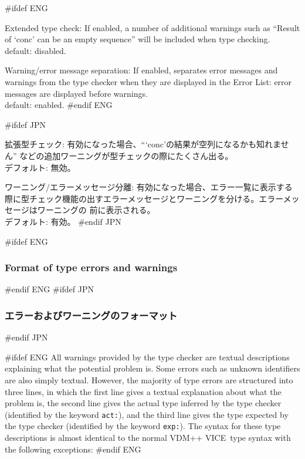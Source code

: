 \documentclass[\pformat,12pt]{article}
\newcommand{\vdmslpp}{VDM-SL}
\newcommand{\vdmslpp}{VDM++}
\renewcommand{\vdmslpp}{VDM++ VICE}
\newcommand{\guicmd}[1]{{\sf #1}}
\newcommand{\guicmd}[1]{{\gt #1}}
\begin{document}
\begin{list}{}{}
#ifdef ENG
\item[{\sf Extended type check}:] If enabled, a number of additional
  warnings such as ``Result of `conc' can be an empty sequence'' will
  be included when type checking. \\
  default: disabled.

\item[\textsf{Warning/error message separation}:] If enabled,
  separates error messages and warnings from the type checker when
  they are displayed in the \guicmd{Error List}: error messages are
  displayed before warnings.\\
  default: enabled. 
#endif ENG

#ifdef JPN
\item[{\sf 拡張型チェック}:]  有効になった場合、“‘conc’の結果が空列になるかも知れません”
などの追加ワーニングが型チェックの際にたくさん出る。\\
  デフォルト: 無効。

\item[\textsf{ワーニング/エラーメッセージ分離}:] 有効になった場合、エラー一覧に表示する
  際に型チェック機能の出すエラーメッセージとワーニングを分ける。エラーメッセージはワーニングの
  前に表示される。\\
  デフォルト: 有効。
#endif JPN
\end{list}


#ifdef ENG
\subsubsection{Format of type errors and warnings}\label{subsub:tcerr}
#endif ENG
#ifdef JPN
\subsubsection{エラーおよびワーニングのフォーマット}\label{subsub:tcerr}
#endif JPN

#ifdef ENG
All warnings provided by the type checker are textual descriptions
explaining what the potential problem is. Some errors such as unknown
identifiers are also simply textual. However, the majority of type
errors are structured into three lines, in which the first line gives
a textual explanation about what the problem is, the second line gives
the actual type inferred by the type checker (identified by the keyword
\texttt{act:}), and the third line gives the type expected by the type
checker (identified by the keyword \texttt{exp:}). The syntax for these
type descriptions is almost identical to the normal \vdmslpp\ type syntax
with the following exceptions:
#endif ENG
\end{document}
